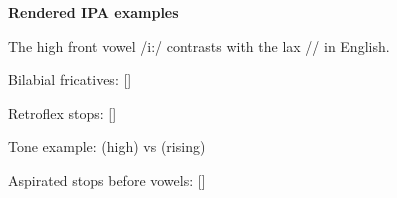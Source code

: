 \documentclass{article}
\begin{document}
\begin{center}
\textbf{Rendered IPA examples}\par\medskip

The high front vowel /i:/ contrasts with the lax // in English.\par
Bilabial fricatives: [\textipa{\textphi\textbeta}]\par
Retroflex stops: [\textipa{\textrtailt\textrtaild}]\par
Tone example:  (high) vs  (rising)\par
Aspirated stops before vowels: []\par
\end{center}
\end{document}
